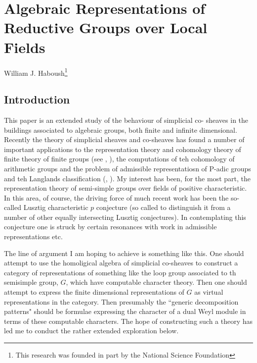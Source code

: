 \chapter{Algebraic Representations of Reductive Groups over Local Fields}\label{chap6}


\begin{center}
William J. Haboush\footnote{This research was founded in part by the National Science Foundation}
\end{center}

\section*{Introduction}
\pageoriginale

This paper is an extended study of the behaviour of simplicial co- sheaves in the buildings associated to algebraic groups, both finite and infinite dimensional. Recently the theory of simplicial sheaves and co-sheaves has found a number of important applications to the representation theory and cohomology theory of finite theory of finite groups (see \cite{chap6-keyT}, \cite{chap6-keyRS}), the computations of teh cohomology of arithmetic groups and the problem of admissible representatiosn of P-adic groups and teh Langlands classification (\cite{chap6-keyCW}, \cite{chap6-keyBW}). My interest has been, for the most part, the representation theory of semi-simple groups over fields of positive characteristic. In this area, of course, the driving force of much recent work has been the so-called Lusztig characteristic $p$ conjecture \cite{chap6-keyL1} (so called to distinguish it from a number of other equally intersecting Lusztig conjectures). In contemplating this conjecture one is struck by certain resonances with work in admissible representations etc.

The line of argument I am hoping to achieve is something like this. One should attempt to use the homoligical algebra of simplicial co-sheaves to construct a category of representations of something like the loop group associated to th semisimple group, $G$, which have computable character theory. Then one should attempt to express the finite dimensional representations of $G$ as virtual representations in the category. Then presumably the ``generic decomposition patterns" should be formulae expressing the character of a dual Weyl module in terms of these computable characters. The hope of constructing such a theory has led me to conduct the rather extended exploration below.  

